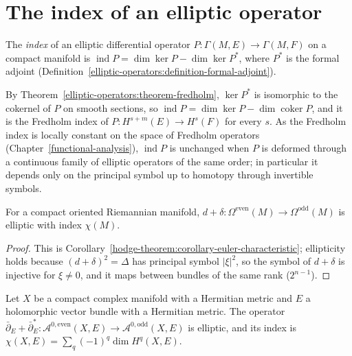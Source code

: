 \section{The index of an elliptic operator}\label{index-theorems:section-index}

\begin{definition}\label{index-theorems:definition-index}
The \emph{index} of an elliptic differential operator $P \colon \Gamma(M, E) \to \Gamma(M, F)$ on a compact manifold is $\operatorname{ind}P = \dim\ker P - \dim\ker P^*$, where $P^*$ is the formal adjoint
(Definition~\ref{elliptic-operators:definition-formal-adjoint}).
\end{definition}

By Theorem~\ref{elliptic-operators:theorem-fredholm}, $\ker P^*$ is isomorphic to the cokernel of $P$ on smooth sections, so $\operatorname{ind}P = \dim\ker P - \dim\operatorname{coker}P$, and it is the Fredholm index of
$P \colon H^{s+m}(E) \to H^s(F)$ for every $s$. As the Fredholm index is locally constant on the space of Fredholm operators (Chapter~\ref{functional-analysis}), $\operatorname{ind}P$ is unchanged when $P$ is deformed through a
continuous family of elliptic operators of the same order; in particular it depends only on the principal symbol up to homotopy through invertible symbols.

\begin{proposition}\label{index-theorems:proposition-euler-operator}
For a compact oriented Riemannian manifold, $d + \delta \colon \Omega^{\mathrm{even}}(M) \to \Omega^{\mathrm{odd}}(M)$ is elliptic with index $\chi(M)$.
\end{proposition}

\begin{proof}
This is Corollary~\ref{hodge-theorem:corollary-euler-characteristic}; ellipticity holds because $(d + \delta)^2 = \Delta$ has principal symbol $|\xi|^2$, so the symbol of $d + \delta$ is injective for $\xi \neq 0$, and it maps between bundles of
the same rank ($2^{n-1}$).
\end{proof}

\begin{proposition}\label{index-theorems:proposition-dolbeault-operator}
Let $X$ be a compact complex manifold with a Hermitian metric and $E$ a holomorphic vector bundle with a Hermitian metric. The operator
$\bar\partial_E + \bar\partial_E^* \colon \mathcal{A}^{0,\mathrm{even}}(X, E) \to \mathcal{A}^{0,\mathrm{odd}}(X, E)$ is elliptic, and its index is $\chi(X, E) = \sum_q(-1)^q\dim H^q(X, E)$.
\end{proposition}


